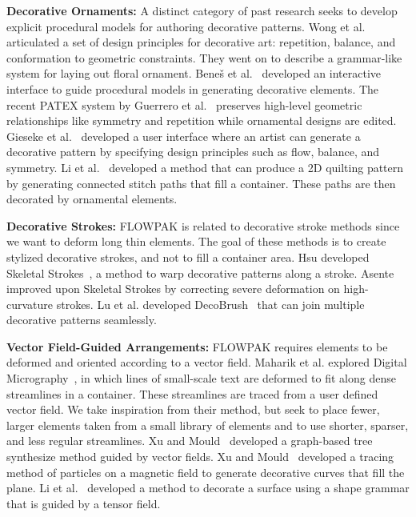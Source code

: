 \newtext
{
\textbf{Decorative Ornaments:} A distinct category of past research seeks to develop explicit procedural
models for authoring decorative patterns.  Wong et al.~\cite{Wong1998}
articulated a set of design principles for decorative art:
repetition, balance, and conformation to geometric constraints.  They
went on to describe a grammar-like system for laying out floral ornament.
Bene\v{s} et al.~\cite{Benes2011} developed an interactive 
interface to guide procedural models in generating decorative elements.
The recent PATEX system by Guerrero 
et al.~\cite{Guerrero2016} preserves high-level geometric relationships
like symmetry and repetition while ornamental designs are edited.
Gieseke et al.~\cite{Gieseke2017} developed a user interface where an artist 
can generate a decorative pattern by specifying design principles such as flow, balance, and symmetry.
Li et al.~\cite{Li2019} developed a method that can produce a 2D quilting pattern
by generating connected stitch paths that fill a container. These paths are then decorated by ornamental elements.
}

\newtext
{
\textbf{Decorative Strokes:}
FLOWPAK is related to decorative stroke methods since we want to deform long thin elements. 
The goal of these methods is to create stylized decorative strokes, and not to fill a container area. 
Hsu developed Skeletal Strokes~\cite{Hsu1993}, a method to warp decorative patterns along a stroke.
Asente~\cite{Asente2010} improved upon Skeletal Strokes by correcting severe deformation on high-curvature strokes.
Lu et al. developed DecoBrush~\cite{Lu2014} that can join multiple decorative patterns seamlessly.
}

\newtext
{
\textbf{Vector Field-Guided Arrangements:} 
FLOWPAK requires elements to be deformed and oriented according to a vector field.
Maharik et al. explored Digital Micrography~\cite{Maharik2011}, in which
lines of small-scale text are deformed to fit along dense streamlines in a container.
These streamlines are traced from a user defined vector field.
We take inspiration from their method, but seek to place fewer,
larger elements taken from a small library of elements and to use shorter, sparser, and less regular streamlines. 
Xu and Mould~\cite{Xu2015} developed a graph-based tree synthesize method guided by vector fields.
Xu and Mould~\cite{Xu2009} developed a tracing method of particles on a magnetic field to
generate decorative curves that fill the plane.
Li et al.~\cite{Li2010} developed a method to decorate a surface using a shape grammar that is guided by a tensor field.
}

